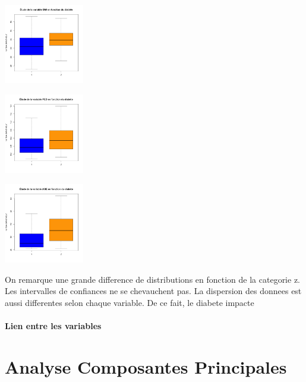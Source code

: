\documentclass[]{report}
\begin{document}
\begin{center}
\begin{minipage}[t]{0.3\textwidth}
	\end{minipage}
	\begin{minipage}[t]{0.3\textwidth}
		\includegraphics[width=35mm]{Figures/Pima/bxp_z_bmi.png}
	\end{minipage}
	\newline
	\begin{minipage}[t]{0.3\textwidth}
		\includegraphics[width=35mm]{Figures/Pima/bxp_z_ped.png}
	\end{minipage}
	\begin{minipage}[t]{0.3\textwidth}
		\includegraphics[width=35mm]{Figures/Pima/bxp_z_age.png}
	\end{minipage}
\end{center}

On remarque une grande difference de distributions en fonction de la categorie z. Les intervalles de confiances ne se chevauchent pas. La dispersion des donnees est aussi differentes selon chaque variable. De ce fait, le diabete impacte 

\subsubsection{Lien entre les variables}


\chapter{Analyse Composantes Principales}
\end{document}
